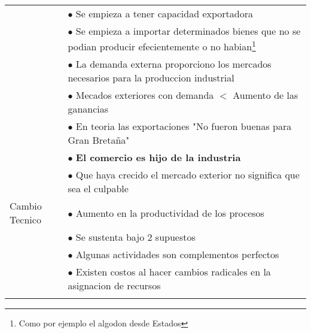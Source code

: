 \begin{tabular}{p{3cm}|p{12cm}}
                               & \hspace{1cm} $\bullet$ Se empieza a tener capacidad exportadora                                                                                                           \\
                               & \hspace{1cm} $\bullet$ Se empieza a importar determinados bienes que no se podian producir efecientemente o no habian\footnote{Como por ejemplo el algodon desde Estados} \\
                               & $\bullet$ La demanda externa proporciono los mercados necesarios para la produccion industrial                                                                            \\
                               & $\bullet$ Mecados exteriores con demanda $<$ Aumento de las ganancias                                                                                                     \\
                               & $\bullet$ En teoria las exportaciones "No fueron buenas para Gran Bretaña"                                                                                                \\
                               & $\bullet$ {\bf El comercio es hijo de la industria}                                                                                                                       \\
                               & $\bullet$ Que haya crecido el mercado exterior no significa que sea el culpable                                                                                           \\ \hline
  Cambio    Tecnico            & $\bullet$ Aumento en la productividad de los procesos                                                                                                                     \\
                               & $\bullet$ Se sustenta bajo 2 supuestos                                                                                                                                    \\
                               & \hspace{1cm} $\bullet$ Algunas actividades son complementos perfectos                                                                                                     \\
                               & \hspace{1cm} $\bullet$ Existen costos al hacer cambios radicales en la asignacion de recursos                                                                             \\                                                                                  \\

\end{tabular}

